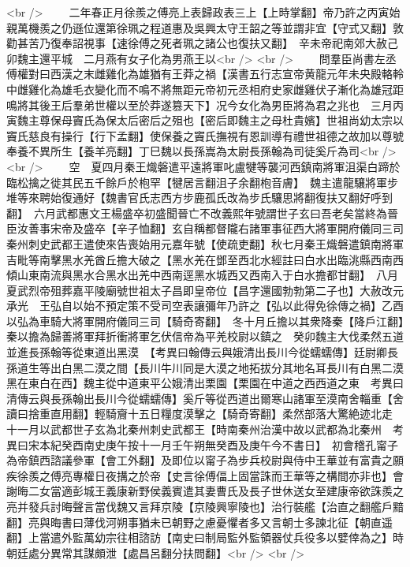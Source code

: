 <br />
　　二年春正月徐羨之傅亮上表歸政表三上【上時掌翻】帝乃許之丙寅始親萬機羨之仍遜位還第徐珮之程道惠及吳興太守王韶之等並謂非宜【守式又翻】敦勸甚苦乃復奉詔視事【速徐傅之死者珮之諸公也復扶又翻】　辛未帝祀南郊大赦己卯魏主還平城　二月燕有女子化為男燕王以<br />
<br />
　　問羣臣尚書左丞傅權對曰西漢之末雌雞化為雄猶有王莽之禍【漢書五行志宣帝黄龍元年未央殿輅軨中雌雞化為雄毛衣變化而不鳴不將無距元帝初元丞相府史家雌雞伏子漸化為雄冠距鳴將其後王后羣弟世權以至於莽遂篡天下】况今女化為男臣將為君之兆也　三月丙寅魏主尊保母竇氏為保太后密后之殂也【密后即魏主之母杜貴嬪】世祖尚幼太宗以竇氏慈良有操行【行下孟翻】使保養之竇氏撫視有恩訓導有禮世祖德之故加以尊號奉養不異所生【養羊亮翻】丁巳魏以長孫嵩為太尉長孫翰為司徒奚斤為司<br />
<br />
　　空　夏四月秦王熾磐遣平遠將軍叱盧犍等襲河西鎮南將軍沮渠白蹄於臨松擒之徙其民五千餘戶於枹罕【犍居言翻沮子余翻枹音膚】　魏主遣龍驤將軍步堆等來聘始復通好【魏書官氏志西方步鹿孤氏改為步氏驤思將翻復扶又翻好呼到翻】　六月武都惠文王楊盛卒初盛聞晉亡不改義熙年號謂世子玄曰吾老矣當終為晉臣汝善事宋帝及盛卒【辛子恤翻】玄自稱都督隴右諸軍事征西大將軍開府儀同三司秦州刺史武都王遣使來告喪始用元嘉年號【使疏吏翻】秋七月秦王熾磐遣鎮南將軍吉毗等南擊黑水羌酋丘擔大破之【黑水羌在鄧至西北水經註曰白水出臨洮縣西南西傾山東南流與黑水合黑水出羌中西南逕黑水城西又西南入于白水擔都甘翻】　八月夏武烈帝殂葬嘉平陵廟號世祖太子昌即皇帝位【昌字還國勃勃第二子也】大赦改元承光　王弘自以始不預定策不受司空表讓彌年乃許之【弘以此得免徐傳之禍】乙酉以弘為車騎大將軍開府儀同三司【騎奇寄翻】　冬十月丘擔以其衆降秦【降戶江翻】秦以擔為歸善將軍拜折衝將軍乞伏信帝為平羌校尉以鎮之　癸卯魏主大伐柔然五道並進長孫翰等從東道出黑漠　【考異曰翰傳云與娥清出長川今從蠕蠕傳】廷尉卿長孫道生等出白黑二漠之間【長川牛川同是大漠之地拓拔分其地名耳長川有白黑二漠黑在東白在西】魏主從中道東平公娥清出栗園【栗園在中道之西西道之東　考異曰清傳云與長孫翰出長川今從蠕蠕傳】奚斤等從西道出爾寒山諸軍至漠南舍輜重【舍讀曰捨重直用翻】輕騎齎十五日糧度漠擊之【騎奇寄翻】柔然部落大驚絶迹北走　十一月以武都世子玄為北秦州刺史武都王【時南秦州治漢中故以武都為北秦州　考異曰宋本紀癸酉南史庚午按十一月壬午朔無癸酉及庚午今不書日】　初會稽孔甯子為帝鎮西諮議參軍【會工外翻】及即位以甯子為步兵校尉與侍中王華並有富貴之願疾徐羨之傅亮專權日夜搆之於帝【史言徐傅偪上固當誅而王華等之構間亦非也】會謝晦二女當適彭城王義康新野侯義賓遣其妻曹氏及長子世休送女至建康帝欲誅羨之亮并發兵討晦聲言當伐魏又言拜京陵【京陵興寧陵也】治行裝艦【治直之翻艦戶黯翻】亮與晦書曰薄伐河朔事猶未已朝野之慮憂懼者多又言朝士多諫北征【朝直遥翻】上當遣外監萬幼宗往相諮訪【南史曰制局監外監領器仗兵役多以嬖倖為之】時朝廷處分異常其謀頗泄【處昌呂翻分扶問翻】<br />
<br />
